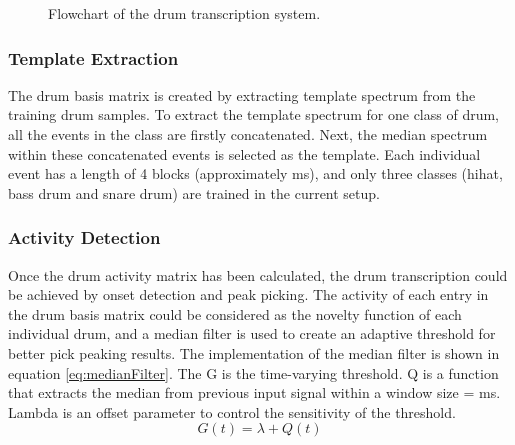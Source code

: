 \documentclass{article}
\begin{document}
\begin{figure}
 \centerline{}
 \caption{Flowchart of the drum transcription system.}
 \label{fig:flowchart}
\end{figure}

\subsubsection{Template Extraction}\label{subsubsec:template extraction}
The drum basis matrix is created by extracting template spectrum from the training drum samples. To extract the template spectrum for one class of drum, all the events in the class are firstly concatenated. Next, the median spectrum within these concatenated events is selected as the template. Each individual event has a length of 4 blocks (approximately \unit[80]{ms}), and only three classes (hihat, bass drum and snare drum) are trained in the current setup.   

\subsubsection{Activity Detection}\label{subsubsec:activity detection}
Once the drum activity matrix has been calculated, the drum transcription could be achieved by onset detection and peak picking. The activity of each entry in the drum basis matrix could be considered as the novelty function of each individual drum, and a median filter is used to create an adaptive threshold for better pick peaking results. The implementation of the median filter is shown in equation \eqref{eq:medianFilter}. The G is the time-varying threshold. Q is a function that extracts the median from previous input signal within a window size = \unit[100]{ms}. Lambda is an offset parameter to control the sensitivity of the threshold.
\begin{equation}
G(t) = \lambda + Q(t)
\label{eq:medianFilter}
\end{equation}\\
\end{document}
